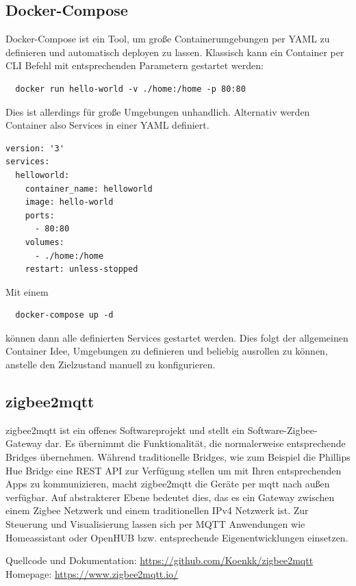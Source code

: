 \subsection{Docker-Compose}

Docker-Compose ist ein Tool, um große Containerumgebungen per YAML zu definieren und automatisch deployen zu lassen. Klassisch kann ein Container 
per CLI Befehl mit entsprechenden Parametern gestartet werden:
\begin{lstlisting}
  docker run hello-world -v ./home:/home -p 80:80
\end{lstlisting}

Dies ist allerdings für große Umgebungen unhandlich. Alternativ werden Container also Services in einer YAML definiert.

\begin{lstlisting}
version: '3'
services:
  helloworld:
    container_name: helloworld
    image: hello-world
    ports:
      - 80:80
    volumes:
      - ./home:/home
    restart: unless-stopped
\end{lstlisting}

Mit einem 
\begin{lstlisting}
  docker-compose up -d
\end{lstlisting}

können dann alle definierten Services gestartet werden. Dies folgt der allgemeinen Container Idee, Umgebungen zu definieren und beliebig ausrollen 
zu können, anstelle den Zielzustand manuell zu konfigurieren.

\subsection{zigbee2mqtt}

zigbee2mqtt ist ein offenes Softwareprojekt und stellt ein \grqq Software-Zigbee-Gateway \grqq dar. Es übernimmt die Funktionalität, die normalerweise entsprechende
\grqq Bridges \grqq übernehmen. Während traditionelle Bridges, wie zum Beispiel die Phillips Hue Bridge eine REST API zur Verfügung stellen um mit Ihren entsprechenden
Apps zu kommunizieren, macht zigbee2mqtt die Geräte per mqtt nach außen verfügbar. Auf abstrakterer Ebene bedeutet dies, das es ein Gateway zwischen einem Zigbee Netzwerk und
einem traditionellen IPv4 Netzwerk ist. Zur Steuerung und Visualisierung lassen sich per MQTT Anwendungen wie \grqq Homeassistant \grqq oder \grqq OpenHUB \grqq{} bzw. entsprechende
Eigenentwicklungen einsetzen.

Quellcode und Dokumentation: \url{https://github.com/Koenkk/zigbee2mqtt}
Homepage: \url{https://www.zigbee2mqtt.io/}

